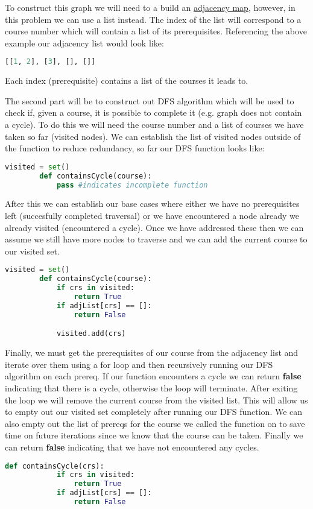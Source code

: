 \documentclass{article}
\begin{document}
\begin{flushleft}
    To construct this graph we will need to a build an \underline{adjacency map}, however, in this problem we can use a list instead.
    The index of the list will correspond to a course number which will contain a list of its prerequisites.
    Referencing the above example our adjacency list would look like:
    \begin{lstlisting}[language=Python]
    [[1, 2], [3], [], []]
    \end{lstlisting}
    Each index (prerequisite) contains a list of the courses it leads to.
\end{flushleft}
\begin{flushleft}
    The second part will be to construct out DFS algorithm which will be used to check if, given a course, it is possible to complete it (e.g. graph does not contain a cycle).
    To do this we will need the course number and a list of courses we have taken so far (visited nodes).
    We can establish the list of visited nodes outside of the function to reduce redundancy, so far our DFS function looks like:
    \begin{lstlisting}[language=python]
        visited = set()
        def containsCycle(course):
            pass #indicates incomplete function
    \end{lstlisting}
    After this we can establish our base cases where either we have no prerequisites left (succesfully completed traversal)
    or we have encountered a node already we already visited (encountered a cycle). Once we have addressed these then we can assume
    we still have more nodes to traverse and we can add the current course to our visited set.
    \begin{lstlisting}[language=python]
        visited = set()
        def containsCycle(course):
            if crs in visited:
                return True
            if adjList[crs] == []:
                return False

            visited.add(crs)
    \end{lstlisting}
    Finally, we must get the prerequisites of our course from the adjacency list and iterate over them using a for loop and then recursively running our DFS algorithm on each prereq.
    If our function encounters a cycle we can return \textbf{false} indicating that there is a cycle, otherwise the loop will terminate.
    After exiting the loop we will remove the current course from the visited list. This will allow us to empty out our visited set completely
    after running our DFS function. We can also empty out the list of prereqs for the course we called the function on to save time on future iterations
    since we know that the course can be taken. Finally we can return \textbf{false} indicating that we have not encountered any cycles.
    \begin{lstlisting}[language=python]
        def containsCycle(crs):
            if crs in visited:
                return True
            if adjList[crs] == []:
                return False


\end{lstlisting}
\end{flushleft}
\end{document}
